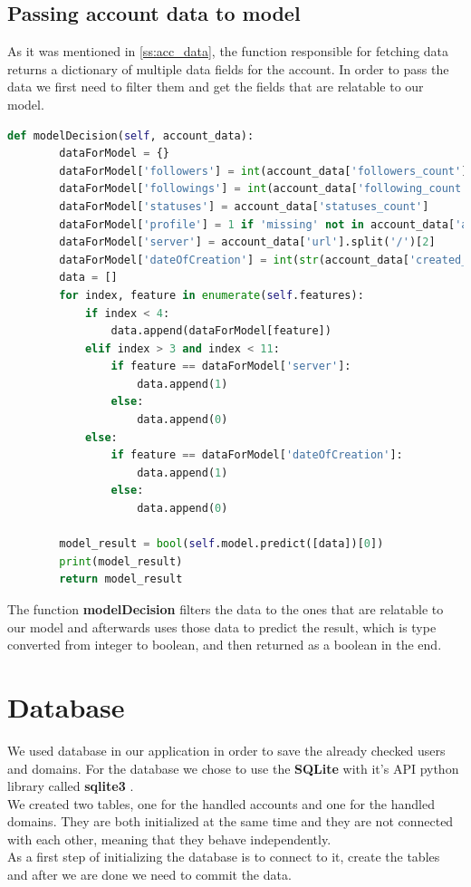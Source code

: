 \subsection{Passing account data to model}
As it was mentioned in \ref{ss:acc_data}, the function responsible for fetching data returns a dictionary of
multiple data fields for the account. In order to pass the data we first need to filter them and get the fields
that are relatable to our model. 
\\[5pt]
\begin{lstlisting}[language=python, caption={Function that returns the model decision}, captionpos=b]
	def modelDecision(self, account_data):
		dataForModel = {}
		dataForModel['followers'] = int(account_data['followers_count'])
		dataForModel['followings'] = int(account_data['following_count'])
		dataForModel['statuses'] = account_data['statuses_count']
		dataForModel['profile'] = 1 if 'missing' not in account_data['avatar'].split('/') else 0
		dataForModel['server'] = account_data['url'].split('/')[2]
		dataForModel['dateOfCreation'] = int(str(account_data['created_at']).split('-')[0])
		data = []
		for index, feature in enumerate(self.features):
			if index < 4:
				data.append(dataForModel[feature])
			elif index > 3 and index < 11:
				if feature == dataForModel['server']:
					data.append(1)
				else:
					data.append(0)
			else:
				if feature == dataForModel['dateOfCreation']:
					data.append(1)
				else:
					data.append(0)
	
		model_result = bool(self.model.predict([data])[0])
		print(model_result)
		return model_result
\end{lstlisting}
The function \textbf{modelDecision} filters the data to the ones that are relatable to our model and
afterwards uses those data to predict the result, which is type converted from integer to boolean, and then
returned as a boolean in the end.
\section{Database}
We used database in our application in order to save the already checked users and domains. For the database
we chose to use the \textbf{SQLite} \cite{sqlite} with it's API python library called \textbf{sqlite3} \cite{sqllite3}.
\\[5pt]
We created two tables, one for the handled accounts and one for the handled domains. They are both initialized at the same time
and they are not connected with each other, meaning that they behave independently.
\\[5pt]
As a first step of initializing the database is to connect to it, create the tables and after we are done we need to commit the data.
